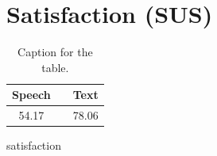 
\section{Satisfaction (SUS)}

\begin{table}[h!]
  \centering
  \label{tab:table1}
  \begin{tabular}{ccc}
    \toprule
    Speech &   & Text\\
    \midrule
    54.17 &   & 78.06\\
    \bottomrule
  \end{tabular}
  \caption{Caption for the table.}
\end{table}

satisfaction